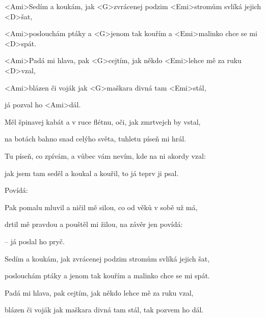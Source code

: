 

\zs
<Ami>Sedím a koukám, jak <G>zvrácenej podzim <Emi>stromům svlíká jejich <D>šat,

<Ami>poslouchám ptáky a <G>jenom tak kouřím a <Emi>malinko chce se mi <D>spát.

<Ami>Padá mi hlava, pak <G>cejtím, jak někdo <Emi>lehce mě za ruku <D>vzal,

<Ami>blázen či voják jak <G>maškara divná tam <Emi>stál,

já pozval ho <Ami>dál.
\ks

\zs
Měl špinavej kabát a v ruce flétnu, oči, jak zmrtvejch by vstal,

na botách bahno snad celýho světa, tuhletu píseň mi hrál.

Tu píseň, co zpívám, a vůbec vám nevím, kde na ni akordy vzal:

jak jsem tam seděl a koukal a kouřil, to já teprv ji psal.
\ks

\zs
Povídá: 
\ks

\zs
Pak pomalu mluvil a ničil mě silou, co od věků v sobě už má,

drtil mě pravdou a pouštěl mi žilou, na závěr jen povídá:

 – já poslal ho pryč.
\ks

\zs
Sedím a koukám, jak zvrácenej podzim stromům svlíká jejich šat,

poslouchám ptáky a jenom tak kouřím a malinko chce se mi spát.

Padá mi hlava, pak cejtím, jak někdo lehce mě za ruku vzal,

blázen či voják jak maškara divná tam stál, tak pozvem ho dál.
\ks

\kp
